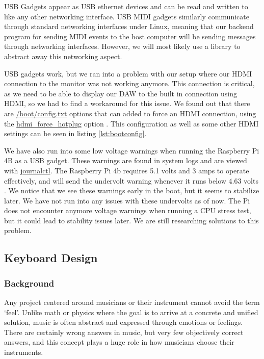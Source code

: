 USB Gadgets appear as USB ethernet devices and can be read and written to like any other
networking interface. USB MIDI gadgets similarly communicate through standard networking
interfaces under Linux, meaning that our backend program for sending MIDI events to the
host computer will be sending messages through networking interfaces. However, we will
most likely use a library to abstract away this networking aspect.

USB gadgets work, but we ran into a problem with our setup where our HDMI connection to
the monitor was not working anymore. This connection is critical, as we need to be able to
display our DAW to the built in connection using HDMI, so we had to find a workaround for
this issue. We found out that there are \url{/boot/config.txt} options that can added to
force an HDMI connection, using the \url{hdmi_force_hotplug} option
\autocite{raspberryPiHDMIFix}. This configuration as well as some other HDMI settings can
be seen in listing \ref{lst:bootconfig}.

We have also run into some low voltage warnings when running the Raspberry Pi 4B as a USB
gadget. These warnings are found in system logs and are viewed with \url{journalctl}. The
Raspberry Pi 4b requires 5.1 volts and 3 amps to operate effectively, and will send the
undervolt warning whenever it runs below 4.63 volts \autocite{raspberryPiAmps}. We notice
that we see these warnings early in the boot, but it seems to stabilize later. We have not
run into any issues with these undervolts as of now. The Pi does not encounter anymore
voltage warnings when running a CPU stress test, but it could lead to stability issues
later.  We are still researching  solutions to this problem.


\subsection{Keyboard Design}

\subsubsection{Background}

Any project centered around musicians or their instrument cannot avoid the term ‘feel’. Unlike math or physics where the goal is to arrive at a concrete and unified solution, music is often abstract and expressed through emotions or feelings. There are certainly wrong answers in music, but very few objectively correct answers, and this concept plays a huge role in how musicians choose their instruments.

